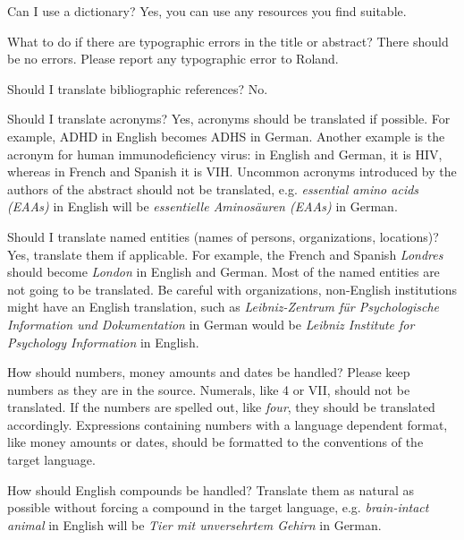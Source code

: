 \documentclass[a4paper,10pt]{article}
\newenvironment{faq}{\begin{description}[style=nextline]}{\end{description}}
\newcommand{\cris}[1]{{\color{red}{#1}}}
\begin{document}
\begin{faq}

  \item[Can I use a dictionary?]
Yes, you can use any resources you find suitable.

  \item[What to do if there are typographic errors in the title or abstract?]
    There should be no errors. Please report any typographic error to Roland.

    
  \item[Should I translate bibliographic references?]
    No.
 
  \item[Should I translate acronyms?]
    Yes, acronyms should be translated if possible. For example, ADHD in English becomes ADHS in German. Another example is the acronym for human immunodeficiency virus: in English and German, it is HIV, whereas in French and Spanish it is VIH.
    Uncommon acronyms introduced by the authors of the abstract should not be translated, e.g. \emph{essential amino acids (EAAs)} in English will be \emph{essentielle Aminos\"auren (EAAs)} in German. 

  \item[Should I translate named entities (names of persons, organizations, locations)?]
    Yes, translate them if applicable. For example, the French and Spanish \textit{Londres} should become \textit{London} in English and German. Most of the named entities are not going to be translated. Be careful with organizations, non-English institutions might have an English translation, such as \textit{Leibniz-Zentrum f\"ur Psychologische Information und Dokumentation} in German would be \textit{Leibniz Institute for Psychology Information} in English. 
  
\item[How should numbers, money amounts and dates be handled?]
 Please keep numbers as they are in the source. Numerals, like 4 or VII, should not be translated. If the numbers are spelled out, like \emph{four}, they should be translated accordingly. Expressions containing numbers with a language dependent format, like money amounts or dates, should be formatted to the conventions of the target language.
    
\item[How should English compounds be handled?]
Translate them as natural as possible without forcing a compound in the target language, e.g. \textit{brain-intact animal} in English will be \textit{Tier mit unversehrtem Gehirn} in German.
\end{faq}
\end{document}
